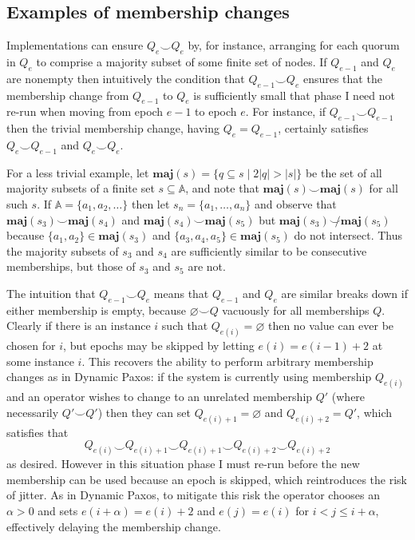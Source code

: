 \documentclass[journal]{IEEEtran}
\begin{document}
\subsection{Examples of membership changes}\label{types-of-membership-change}

\def\maj#1{\mathbf{maj}(#1)}

Implementations can ensure $Q_e \smile Q_e$ by, for instance, arranging for
each quorum in $Q_e$ to comprise a majority subset of some finite set of nodes.
If $Q_{e-1}$ and $Q_e$ are nonempty then intuitively the condition that
$Q_{e-1} \smile Q_e$ ensures that the membership change from $Q_{e-1}$ to $Q_e$
is sufficiently small that phase I need not re-run when moving from epoch $e-1$
to epoch $e$.  For instance, if $Q_{e-1} \smile Q_{e-1}$ then the trivial
membership change, having $Q_e = Q_{e-1}$, certainly satisfies $Q_e \smile
Q_{e-1}$ and $Q_e \smile Q_e$.

For a less trivial example, let $\maj{s} = \{ q \subseteq s \mid 2 |q| > |s|
\}$ be the set of all majority subsets of a finite set $s \subseteq \mathbb A$,
and note that $\maj{s} \smile \maj{s}$ for all such $s$.  If $\mathbb A = \{
a_1, a_2, \ldots \}$ then let $s_n = \{a_1, \ldots, a_n\}$ and observe that
$\maj{s_3} \smile \maj{s_4}$ and $\maj{s_4} \smile \maj{s_5}$ but $\maj{s_3}
\not\smile \maj{s_5}$ because $\{a_1, a_2\} \in \maj{s_3}$ and $\{a_3, a_4,
a_5\} \in \maj{s_5}$ do not intersect. Thus the majority subsets of $s_3$ and
$s_4$ are sufficiently similar to be consecutive memberships, but those of
$s_3$ and $s_5$ are not.

The intuition that $Q_{e-1} \smile Q_e$ means that $Q_{e-1}$ and $Q_e$ are
similar breaks down if either membership is empty, because $\varnothing \smile
Q$ vacuously for all memberships $Q$. Clearly if there is an instance $i$ such
that $Q_{e(i)} = \varnothing$ then no value can ever be chosen for $i$, but
epochs may be skipped by letting $e(i) = e(i-1) + 2$ at some instance $i$.
This recovers the ability to perform arbitrary membership changes as in Dynamic
Paxos: if the system is currently using membership $Q_{e(i)}$ and an operator
wishes to change to an unrelated membership $Q'$ (where necessarily $Q' \smile
Q'$) then they can set $Q_{e(i)+1} = \varnothing$ and $Q_{e(i)+2} = Q'$, which
satisfies that \[Q_{e(i)} \smile Q_{e(i) + 1} \smile Q_{e(i)+1} \smile Q_{e(i)
+ 2} \smile Q_{e(i) + 2}\] as desired. However in this situation phase I must
re-run before the new membership can be used because an epoch is skipped, which
reintroduces the risk of jitter. As in Dynamic Paxos, to mitigate this risk the
operator chooses an $\alpha > 0$ and sets $e(i+\alpha) = e(i)+2$ and $e(j) =
e(i)$ for $i < j \le i + \alpha$, effectively delaying the membership change.
\end{document}
